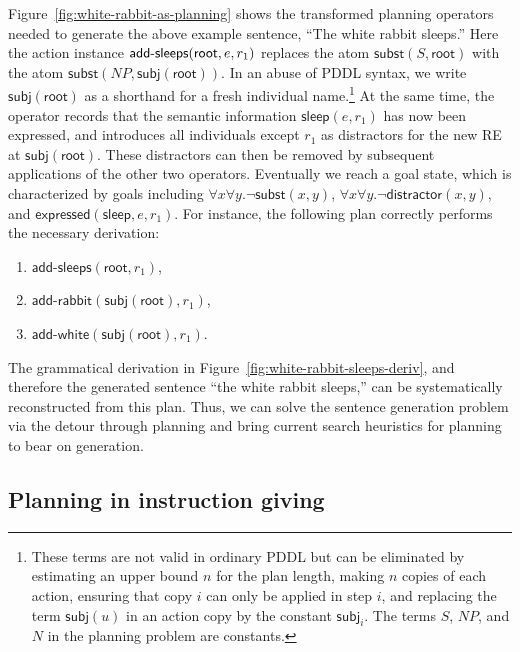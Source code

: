 Figure~\ref{fig:white-rabbit-as-planning} shows the
transformed planning operators needed to generate the above example
sentence, ``The white rabbit sleeps.'' Here the action instance
$\mathsf{add}\textsf{-}\mathsf{sleeps}(\mathsf{root}, e, r_1)$ replaces the atom
$\mathsf{subst}(S,\mathsf{root})$ with the atom
$\mathsf{subst}(NP,\mathsf{subj}(\mathsf{root}))$. In an abuse of PDDL
syntax, we write $\mathsf{subj}(\mathsf{root})$ as a shorthand for a fresh
individual name.\footnote{These terms are not valid in
  ordinary PDDL but can be eliminated by estimating an upper bound $n$
  for the plan length, making $n$ copies of each action, ensuring that
  copy $i$ can only be applied in step $i$, and replacing the term
  $\mathsf{subj}(u)$ in an action copy by the constant
  $\mathsf{subj}_i$. The terms $S$, $NP$, and $N$ in the planning
  problem are constants.}  At the same time, the operator records that
the semantic information $\mathsf{sleep}(e,r_1)$ has now been
expressed, and introduces all individuals except $r_1$ as
distractors for the new RE at $\mathsf{subj}(\mathsf{root})$. These
distractors can then be removed by subsequent applications of the
other two operators. Eventually we reach a goal state, which is
characterized by goals including $\forall x \forall y. \neg
\mathsf{subst}(x,y)$, $\forall x \forall y. \neg
\mathsf{distractor}(x,y)$, and
$\mathsf{expressed}(\mathsf{sleep},e,r_1)$. For instance, the following
plan correctly performs the necessary derivation:
%
\begin{enumerate}
\item $\mathsf{add}\textsf{-}\mathsf{sleeps}(\mathsf{root}, r_1)$,
\item $\mathsf{add}\textsf{-}\mathsf{rabbit}(\mathsf{subj}(\mathsf{root}),r_1)$,
\item $\mathsf{add}\textsf{-}\mathsf{white}(\mathsf{subj}(\mathsf{root}),r_1)$.
\end{enumerate}
%
The grammatical derivation in
Figure~\ref{fig:white-rabbit-sleeps-deriv}, and therefore the
generated sentence ``the white rabbit sleeps,'' can be systematically
reconstructed from this plan. Thus, we can solve the sentence
generation problem via the detour through planning and bring current
search heuristics for planning to bear on generation.


\subsection{Planning in instruction giving}
\label{sec:domain-give}

